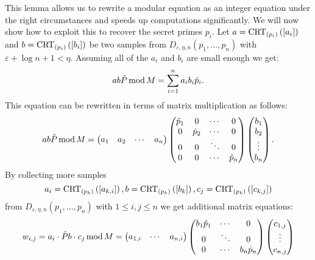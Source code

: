 \documentclass[english]{scrartcl}
\theoremstyle{plain}
\theoremstyle{definition}
\begin{document}
    This lemma allows us to rewrite a modular equation as an integer equation under the right circumstances and speeds up computations significantly.
    We will now show how to exploit this to recover the secret primes $p_i$.
    Let $a = \crtp{a_i}$ and $b = \crtp{b_i}$ be two samples from $D_{\varepsilon, \eta, n}(p_1, \dots, p_n)$ with $\varepsilon + \log n + 1 < \eta$.
    Assuming all of the $a_i$ and $b_i$ are small enough we get:
    \begin{equation*}
        ab\hat{P} \smod M = \sum_{i=1}^n a_i b_i \hat{p}_i.
    \end{equation*}
    This equation can be rewritten in terms of matrix multiplication as follows:
    \begin{equation*}
        ab\hat{P} \smod M =
        \begin{pmatrix}
            a_1 & a_2 & \cdots & a_n
        \end{pmatrix}
        \begin{pmatrix}
            \hat{p}_1 & 0 & \cdots & 0 \\
            0 & \hat{p}_2 & \cdots & 0 \\
            0 & 0 & \ddots & 0 \\
            0 & 0 & \cdots & \hat{p}_n
        \end{pmatrix}
        \begin{pmatrix}
            b_1 \\
            b_2 \\
            \vdots \\
            b_n
        \end{pmatrix}.
    \end{equation*}
    By collecting more samples
    \begin{equation*}
        a_i = \crtp[k]{a_{k, i}}, b = \crtp[k]{b_k}, c_j = \crtp[k]{c_{k, j}}
    \end{equation*}
    from $D_{\varepsilon, \eta, n}(p_1, \dots, p_n)$ with $1 \leq i,j \leq n$ we get additional matrix equations:
    \begin{equation*}
        w_{i,j} = a_i \cdot \hat{P} b \cdot c_j \smod M =
        \begin{pmatrix}
            a_{1, i} & \cdots & a_{n, i}
        \end{pmatrix}
        \begin{pmatrix}
            b_1 \hat{p}_1 & \cdots & 0 \\
            0 & \ddots & 0 \\
            0 & \cdots & b_n \hat{p}_n
        \end{pmatrix}
        \begin{pmatrix}
            c_{1, j} \\
            \vdots \\
            c_{n, j}
        \end{pmatrix}
    \end{equation*}
\end{document}
